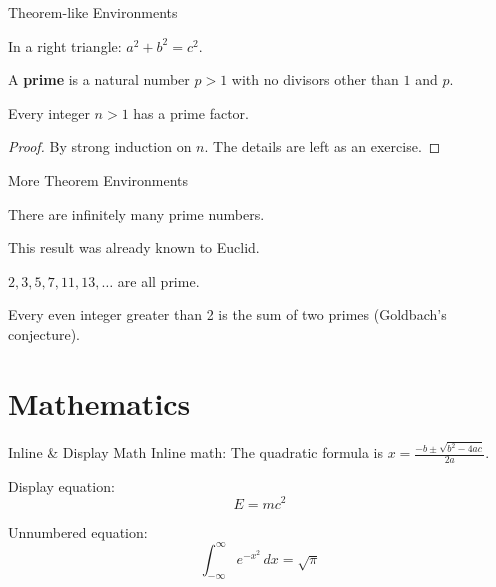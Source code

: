 \documentclass[aspectratio=169]{beamer}
\begin{document}
\begin{frame}{Theorem-like Environments}
  \begin{theorem}
    In a right triangle: $a^2 + b^2 = c^2$.
  \end{theorem}

  \begin{definition}
    A \textbf{prime} is a natural number $p > 1$ with no divisors other than $1$ and $p$.
  \end{definition}

  \begin{lemma}
    Every integer $n > 1$ has a prime factor.
  \end{lemma}

  \begin{proof}
    By strong induction on $n$. The details are left as an exercise.
  \end{proof}
\end{frame}

\begin{frame}{More Theorem Environments}
  \begin{corollary}
    There are infinitely many prime numbers.
  \end{corollary}

  \begin{remark}
    This result was already known to Euclid.
  \end{remark}

  \begin{example}
    $2, 3, 5, 7, 11, 13, \ldots$ are all prime.
  \end{example}

  \begin{proposition}
    Every even integer greater than 2 is the sum of two primes (Goldbach's conjecture).
  \end{proposition}
\end{frame}

\section{Mathematics}

\begin{frame}{Inline \& Display Math}
  Inline math: The quadratic formula is $x = \frac{-b \pm \sqrt{b^2-4ac}}{2a}$.

  \bigskip

  Display equation:
  \begin{equation}
    E = mc^2
  \end{equation}

  Unnumbered equation:
  \begin{equation*}
    \int_{-\infty}^{\infty} e^{-x^2} \, dx = \sqrt{\pi}
  \end{equation*}
\end{frame}
\end{document}
